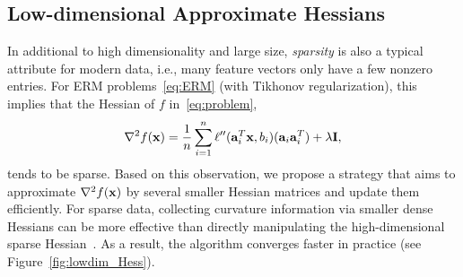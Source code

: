 \documentclass[10pt,twocolumn,journal]{IEEEtran}
\begin{document}
\subsection{Low-dimensional Approximate Hessians}\label{sec:low_dim_Hessian}
In additional to high dimensionality and large size, {\em sparsity} is also a typical attribute for modern data, i.e., many feature vectors %
only have a few nonzero entries. For ERM problems~\eqref{eq:ERM} (with Tikhonov regularization), this implies that the Hessian of $f$ in~\eqref{eq:problem},
\begin{equation}
\nabla^2 f(\mathbf{x}) = \frac{1}{n}\sum_{i=1}^n \ell''(\mathbf{a}_i^T\mathbf{x},b_i)(\mathbf{a}_i\mathbf{a}_i^T)+\lambda\mathbf{I},\label{eq:Hess_ERM}
\end{equation}
tends to be sparse. Based on this observation, we propose a strategy that aims to approximate %
$\nabla^2 f(\mathbf{x})$ {by} several smaller Hessian matrices and  update them efficiently. %
For sparse data, collecting curvature information via smaller dense Hessians can be more effective than {directly manipulating the} high-dimensional sparse Hessian~\cite{Nocedal_06}. As a result, the algorithm converges faster in practice (see Figure~\ref{fig:lowdim_Hess}). 
\end{document}

